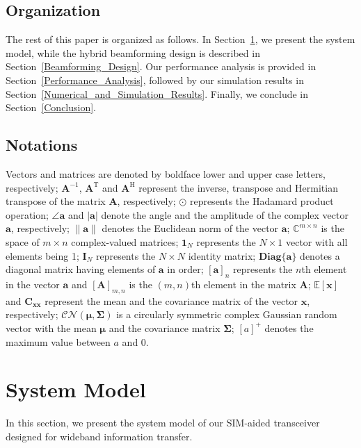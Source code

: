 \documentclass[lettersize,journal]{IEEEtran}
\theoremstyle{remark}
\begin{document}
\subsection{Organization}
The rest of this paper is organized as follows. In Section~\ref{System_Model}, we present the system model, while the hybrid beamforming design is described in Section~\ref{Beamforming_Design}. Our performance analysis is provided in Section~\ref{Performance_Analysis}, followed by our simulation results in Section~\ref{Numerical_and_Simulation_Results}. Finally, we conclude in Section~\ref{Conclusion}.

\subsection{Notations}
Vectors and matrices are denoted by boldface lower and upper case letters, respectively; $\mathbf{A}^{-1}$, $\mathbf{A}^{\text{T}}$ and $\mathbf{A}^{\text{H}}$ represent the inverse, transpose and Hermitian transpose of the matrix $\mathbf{A}$, respectively; $\odot$ represents the Hadamard product operation; $\angle\mathbf{a}$ and $|\mathbf{a}|$ denote the angle and the amplitude of the complex vector $\mathbf{a}$, respectively; $\|\mathbf{a}\|$ denotes the Euclidean norm of the vector $\mathbf{a}$; $\mathbb{C}^{m\times n}$ is the space of $m\times n$ complex-valued matrices; $\mathbf{1}_{N}$ represents the $N\times1$ vector with all elements being 1; $\mathbf{I}_{N}$ represents the $N\times N$ identity matrix; $\mathbf{Diag}\{\mathbf{a}\}$ denotes a diagonal matrix having elements of $\mathbf{a}$ in order; $[\mathbf{a}]_n$ represents the $n$th element in the vector $\mathbf{a}$ and $[\mathbf{A}]_{m,n}$ is the $(m,n)$th element in the matrix $\mathbf{A}$; $\mathbb{E}[\mathbf{x}]$ and $\mathbf{C}_{\mathbf{x}\mathbf{x}}$ represent the mean and the covariance matrix of the vector $\mathbf{x}$, respectively; $\mathcal{CN}(\boldsymbol{\mu},\mathbf{\Sigma})$ is a circularly symmetric complex Gaussian random vector with the mean $\boldsymbol{\mu}$ and the covariance matrix $\mathbf{\Sigma}$; $[a]^{+}$ denotes the maximum value between $a$ and 0.


\section{System Model}\label{System_Model}
In this section, we present the system model of our SIM-aided transceiver designed for wideband information transfer.
\end{document}
